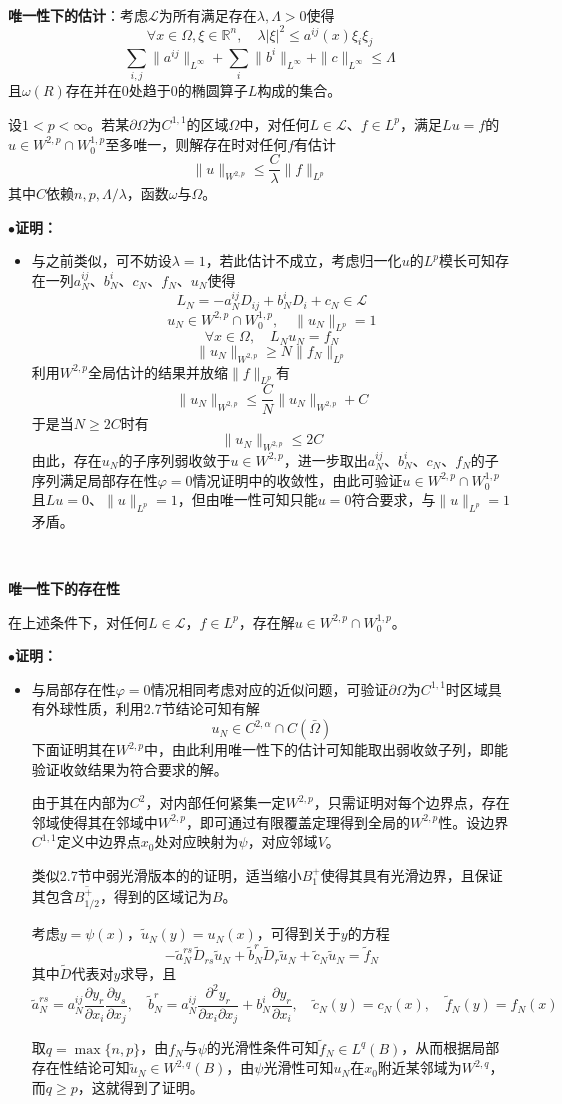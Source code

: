 \documentclass[a4paper,UTF8,fontset=windows,AutoFakeBold]{ctexart}
\newcommand{\proo}[1]{{\kaishu $\bullet$\textbf{证明：}
\begin{itemize}
    \item[] #1
\end{itemize}
}}
\begin{document}
\

\textbf{唯一性下的估计}：考虑$\mathcal{L}$为所有满足存在$\lambda,\Lambda>0$使得
$$\forall x\in\Omega,\xi\in\mathbb{R}^n,\quad\lambda|\xi|^2\le a^{ij}(x)\xi_i\xi_j$$
$$\sum_{i,j}\|a^{ij}\|_{L^\infty}+\sum_i\|b^i\|_{L^\infty}+\|c\|_{L^\infty}\le\Lambda$$
且$\omega(R)$存在并在0处趋于0的椭圆算子$L$构成的集合。

设$1<p<\infty$。若某$\partial\Omega$为$C^{1,1}$的区域$\Omega$中，对任何$L\in\mathcal{L}$、$f\in L^p$，满足$Lu=f$的$u\in W^{2,p}\cap W^{1,p}_0$至多唯一，则解存在时对任何$f$有估计
$$\|u\|_{W^{2,p}}\le\frac{C}{\lambda}\|f\|_{L^p}$$
其中$C$依赖$n,p,\Lambda/\lambda$，函数$\omega$与$\Omega$。

\proo{
    与之前类似，可不妨设$\lambda=1$，若此估计不成立，考虑归一化$u$的$L^p$模长可知存在一列$a_N^{ij}$、$b_N^i$、$c_N$、$f_N$、$u_N$使得
    $$L_N=-a_N^{ij}D_{ij}+b_N^iD_i+c_N\in\mathcal{L}$$
    $$u_N\in W^{2,p}\cap W_0^{1,p},\quad\|u_N\|_{L^p}=1$$
    $$\forall x\in\Omega,\quad L_Nu_N=f_N$$
    $$\|u_N\|_{W^{2,p}}\ge N\|f_N\|_{L^p}$$
    利用$W^{2,p}$全局估计的结果并放缩$\|f\|_{L^p}$有
    $$\|u_N\|_{W^{2,p}}\le\frac{C}{N}\|u_N\|_{W^{2,p}}+C$$
    于是当$N\ge 2C$时有
    $$\|u_N\|_{W^{2,p}}\le 2C$$
    由此，存在$u_N$的子序列弱收敛于$u\in W^{2,p}$，进一步取出$a_N^{ij}$、$b_N^i$、$c_N$、$f_N$的子序列满足局部存在性$\varphi=0$情况证明中的收敛性，由此可验证$u\in W^{2,p}\cap W_0^{1,p}$且$Lu=0$、$\|u\|_{L^p}=1$，但由唯一性可知只能$u=0$符合要求，与$\|u\|_{L^p}=1$矛盾。
}

\

\textbf{唯一性下的存在性}

在上述条件下，对任何$L\in\mathcal{L}$，$f\in L^p$，存在解$u\in W^{2,p}\cap W_0^{1,p}$。

\proo{
    与局部存在性$\varphi=0$情况相同考虑对应的近似问题，可验证$\partial\Omega$为$C^{1,1}$时区域具有外球性质，利用2.7节结论可知有解
    $$u_N\in C^{2,\alpha}\cap C(\bar\Omega)$$
    下面证明其在$W^{2,p}$中，由此利用唯一性下的估计可知能取出弱收敛子列，即能验证收敛结果为符合要求的解。

    由于其在内部为$C^2$，对内部任何紧集一定$W^{2,p}$，只需证明对每个边界点，存在邻域使得其在邻域中$W^{2,p}$，即可通过有限覆盖定理得到全局的$W^{2,p}$性。设边界$C^{1,1}$定义中边界点$x_0$处对应映射为$\psi$，对应邻域$V$。

    类似2.7节中弱光滑版本的的证明，适当缩小$B_1^+$使得其具有光滑边界，且保证其包含$\overline{B_{1/2}^+}$，得到的区域记为$B$。

    考虑$y=\psi(x)$，$\tilde{u}_N(y)=u_N(x)$，可得到关于$y$的方程
    $$-\tilde{a}_N^{rs}\tilde{D}_{rs}\tilde{u}_N+\tilde{b}_N^r\tilde{D}_r\tilde{u}_N+\tilde{c}_N\tilde{u}_N=\tilde{f}_N$$
    其中$\tilde{D}$代表对$y$求导，且
    $$\tilde{a}_N^{rs}=a_N^{ij}\frac{\partial y_r}{\partial x_i}\frac{\partial y_s}{\partial x_j},\quad\tilde{b}_N^r=a_N^{ij}\frac{\partial^2y_r}{\partial x_i\partial x_j}+b_N^i\frac{\partial y_r}{\partial x_i},\quad\tilde{c}_N(y)=c_N(x),\quad\tilde{f}_N(y)=f_N(x)$$

    取$q=\max\{n,p\}$，由$f_N$与$\psi$的光滑性条件可知$\tilde{f}_N\in L^q(B)$，从而根据局部存在性结论可知$\tilde{u}_N\in W^{2,q}(B)$，由$\psi$光滑性可知$u_N$在$x_0$附近某邻域为$W^{2,q}$，而$q\ge p$，这就得到了证明。
}
\end{document}
